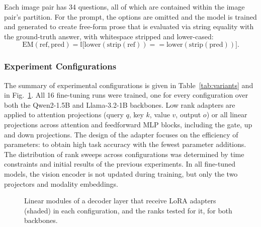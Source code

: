 \documentclass[conference]{IEEEtran}
\begin{document}
Each image pair has 34 questions, all of which are contained within the image pair's partition. For the prompt, the options are omitted and the model is trained and generated to create free-form prose that is evaluated via string equality with the ground-truth answer, with whitespace stripped and lower-cased:
\begin{equation}
\text{EM}(\text{ref}, \text{pred}) = \mathbb{I}\bigl[\text{lower}(\text{strip}(\text{ref})) == \text{lower}(\text{strip}(\text{pred}))\bigr].
\end{equation}

\subsubsection{Experiment Configurations}

The summary of experimental configurations is given in Table~\ref{tab:variants} and in Fig.~\ref{fig:placement}. All 16 fine-tuning runs were trained, one for every configuration over both the Qwen2-1.5B and Llama-3.2-1B backbones. Low rank adapters are applied to attention projections (query $q$, key $k$, value $v$, output $o$) or all linear projections across attention and feedforward MLP blocks, including the gate, up and down projections. The design of the adapter focuses on the efficiency of parameters: to obtain high task accuracy with the fewest parameter additions. The distribution of rank sweeps across configurations was determined by time constraints and initial results of the previous experiments. In all fine-tuned models, the vision encoder is not updated during training, but only the two projectors and modality embeddings.

\begin{figure}[!t]
  \centering
  \caption{Linear modules of a decoder layer that receive LoRA adapters (shaded) in each configuration, and the ranks tested for it, for both backbones.}
  \label{fig:placement}
\end{figure}
\end{document}
